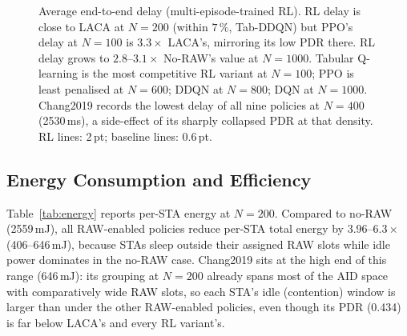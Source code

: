 \documentclass[conference]{IEEEtran}
\begin{document}
\begin{figure}[t]
\caption{Average end-to-end delay (multi-episode-trained RL).  RL delay is
  close to LACA at $N\!=\!200$ (within $7\,\%$, Tab-DDQN) but PPO's delay at
  $N\!=\!100$ is $3.3\times$ LACA's, mirroring its low PDR there.  RL delay
  grows to $2.8$--$3.1\times$ No-RAW's value at $N\!=\!1000$.  Tabular
  Q-learning is the most competitive RL variant at $N\!=\!100$; PPO is least
  penalised at $N\!=\!600$; DDQN at $N\!=\!800$; DQN at $N\!=\!1000$.
  Chang2019 records the lowest delay of all nine policies at $N\!=\!400$
  (2530\,ms), a side-effect of its sharply collapsed PDR at that density.
  RL lines: 2\,pt; baseline lines: 0.6\,pt.}
\label{fig:delay}
\end{figure}

\subsection{Energy Consumption and Efficiency}

Table~\ref{tab:energy} reports per-STA energy at $N = 200$.
Compared to no-RAW (2559\,mJ), all RAW-enabled policies reduce per-STA
total energy by $3.96$--$6.3\times$ (406--646\,mJ), because STAs sleep
outside their assigned RAW slots while idle power dominates in the
no-RAW case.
Chang2019 sits at the high end of this range (646\,mJ): its grouping at
$N=200$ already spans most of the AID space with comparatively wide RAW
slots, so each STA's idle (contention) window is larger than under the
other RAW-enabled policies, even though its PDR (0.434) is far below LACA's
and every RL variant's.
\end{document}
